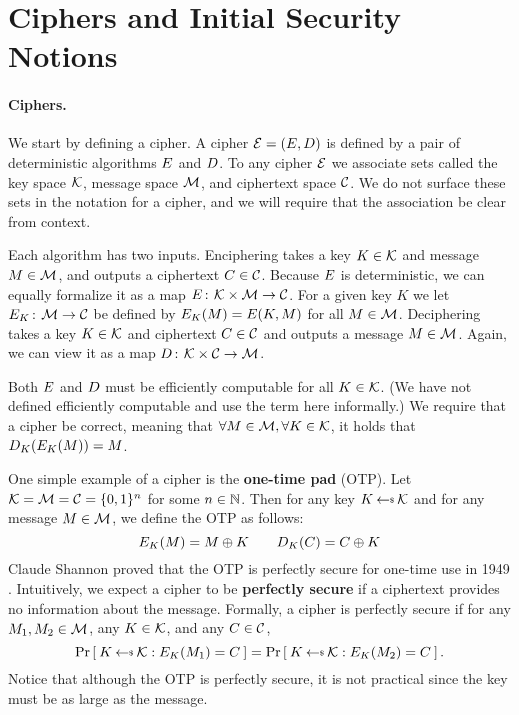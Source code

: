 \section{Ciphers and Initial Security Notions}
\label{sec:se}

\paragraph{Ciphers.}
We start by defining a cipher. A cipher ${\cal E} = (E,D)$ is
defined by a pair of deterministic algorithms $E$ and $D$.  To
any cipher ${\cal E}$ we associate sets called the key space ${\cal K}$, message
space ${\cal M}$, and ciphertext space ${\cal C}$. We do not surface these sets in the
notation for a cipher, and we will require that the association be clear
from context.

Each algorithm has two inputs. Enciphering takes a key $K \in {\cal K}$ and
message $M \in {\cal M}$, and outputs a ciphertext $C \in {\cal C}$. Because
$E$ is deterministic, we can equally formalize it as a map 
$E{{\kern .05em}\colon{\kern .05em}}{\cal K}\times{\cal M}\rightarrow{\cal C}$. For a given key
$K$ we let $E_K{{\kern .05em}\colon{\kern .05em}}{\cal M}\rightarrow{\cal C}$ be defined by
$E_K(M) = E(K,M)$ for all $M \in {\cal M}$.  Deciphering takes a key $K\in {\cal K}$ and ciphertext
$C \in {\cal C}$ and outputs a message $M \in {\cal M}$. Again, we can view
it as a map $D{{\kern .05em}\colon{\kern .05em}}{\cal K}\times{\cal C}\rightarrow{\cal M}$. 

Both $E$ and $D$ must be efficiently computable for all $K \in
{\cal K}$.  (We have not defined efficiently computable and use the term here
informally.) We require that a cipher be correct, meaning that
$\forall M \in {\cal M}, \forall K \in {\cal K}$, it holds that $D_K(E_K(M)) = M$.

\begin{example} One simple example of a cipher is the \textbf{one-time pad} (OTP). Let ${\cal K} = {\cal M}={\cal C}=\{0,1\}^n$ for some $n \in {{\mathbb N}}$. Then for any key $K\getsr\keyspace$ and for any message $M \in {\cal M}$, we define the OTP as follows:
\begin{equation*}
E_K(M) = M \oplus K \qquad
D_K(C) = C \oplus K
\end{equation*}
Claude Shannon proved that the OTP is perfectly secure for one-time use in 1949 \cite{shannon1949communication}. Intuitively, we expect a cipher to be \textbf{perfectly secure} if a ciphertext provides no information about the message.
Formally, a cipher is perfectly secure if for any $M_1, M_2 \in {\cal M}$, any $K \in {\cal K}$, and any $C \in {\cal C}$, 
\begin{equation*}
\Prob{K \getsr \keyspace: \cipherE_{K}(M_1) = C} = \Prob{K \getsr \keyspace: \cipherE_{K}(M_2) = C}.
\end{equation*}
Notice that although the OTP is perfectly secure, it is not practical since the key must be as large as the message. 
\end{example}

